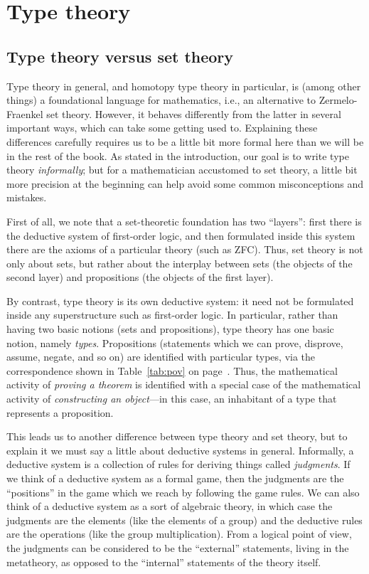 \chapter{Type theory}
\label{cha:typetheory}

\section{Type theory versus set theory}
\label{sec:types-vs-sets}

Type theory in general, and homotopy type theory in particular, is (among other things) a foundational language for mathematics, i.e., an alternative to Zermelo-Fraenkel set theory.
However, it behaves differently from the latter in several important ways, which can take some getting used to.
Explaining these differences carefully requires us to be a little bit more formal here than we will be in the rest of the book.
As stated in the introduction, our goal is to write type theory \emph{informally}; but for a mathematician accustomed to set theory, a little bit more precision at the beginning can help avoid some common misconceptions and mistakes.

First of all, we note that a set-theoretic foundation has two ``layers'': first there is the deductive system of first-order logic, and then formulated inside this system there are the axioms of a particular theory (such as ZFC).
Thus, set theory is not only about sets, but rather about the interplay between sets (the objects of the second layer) and propositions (the objects of the first layer).

By contrast, type theory is its own deductive system: it need not be formulated inside any superstructure such as first-order logic.
In particular, rather than having two basic notions (sets and propositions), type theory has one basic notion, namely \emph{types}.
Propositions (statements which we can prove, disprove, assume, negate, and so on) are identified with particular types, via the correspondence shown in Table~\ref{tab:pov} on page~\pageref{tab:pov}.
Thus, the mathematical activity of \emph{proving a theorem} is identified with a special case of the mathematical activity of \emph{constructing an object}---in this case, an inhabitant of a type that represents a proposition.

This leads us to another difference between type theory and set theory, but to explain it we must say a little about deductive systems in general.
Informally, a deductive system is a collection of rules for deriving things called \emph{judgments}.
If we think of a deductive system as a formal game, then the judgments are the ``positions'' in the game which we reach by following the game rules.
We can also think of a deductive system as a sort of algebraic theory, in which case the judgments are the elements (like the elements of a group) and the deductive rules are the operations (like the group multiplication).
From a logical point of view, the judgments can be considered to be the ``external'' statements, living in the metatheory, as opposed to the ``internal'' statements of the theory itself.


